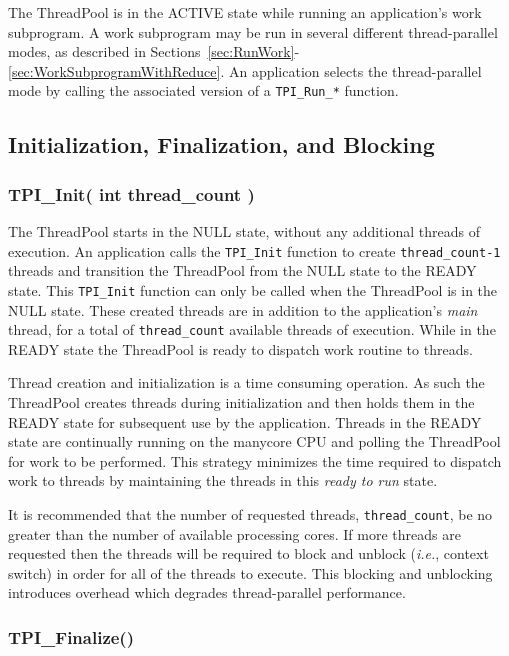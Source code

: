 The ThreadPool is in the ACTIVE state while running an application's work subprogram.
%
A work subprogram may be run in several different thread-parallel modes,
as described in Sections~\ref{sec:RunWork}-\ref{sec:WorkSubprogramWithReduce}.
%
An application selects the thread-parallel mode by calling the associated version of a
\texttt{TPI\_Run\_*} function.


\clearpage
\subsection{Initialization, Finalization, and Blocking}

\subsubsection{TPI\_Init( int thread\_count )}

The ThreadPool starts in the NULL state, without any additional threads of execution.
%
An application calls the \texttt{TPI\_Init} function to create \texttt{thread\_count-1} threads and transition the ThreadPool from the NULL state to the READY state.
%
This \texttt{TPI\_Init} function can only be called when the ThreadPool is in the NULL state.
%
These created threads are in addition to the application's \emph{main} thread, for a total of
\texttt{thread\_count} available threads of execution.
%
While in the READY state the ThreadPool is ready to dispatch work routine to threads.


Thread creation and initialization is a time consuming operation.
%
As such the ThreadPool creates threads during initialization and then holds them in the READY state for subsequent use by the application.
%
Threads in the READY state are continually running on the manycore CPU and polling the ThreadPool for work to be performed.
%
This strategy minimizes the time required to dispatch work to threads by maintaining the threads in this \emph{ready to run} state.


It is recommended that the number of requested threads, \texttt{thread\_count}, be no greater than the number of available processing cores.
%
If more threads are requested then the threads will be required to block and unblock
(\emph{i.e.}, context switch) in order for all of the threads to execute.
%
This blocking and unblocking introduces overhead which degrades thread-parallel performance.


\subsubsection{TPI\_Finalize()}

